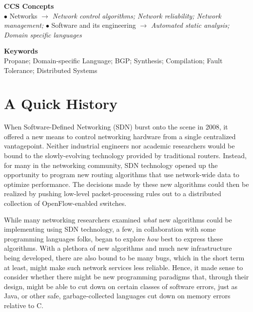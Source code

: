 \documentclass[10pt]{sigalternate052015}
\begin{document}
\vspace{0.1in}
\noindent
\textbf{CCS Concepts}\\
$\bullet$ Networks $\rightarrow$ {\em Network control algorithms; Network reliability; Network management;} 
$\bullet$ Software and its engineering $\rightarrow$ {\em Automated static analysis; Domain specific languages}

\vspace{0.1in}
\noindent
\textbf{Keywords}\\
Propane; Domain-specific Language; BGP; Synthesis; Compilation; Fault Tolerance; Distributed Systems




\section{A Quick History}

When Software-Defined Networking (SDN) burst onto the scene in 2008,
it offered a new means to control networking hardware from a single
centralized vantagepoint.  Neither industrial engineers nor academic
researchers would be bound to the slowly-evolving technology provided by
traditional routers.  Instead, for many in the networking
community, SDN technology opened up the opportunity to program new
routing algorithms that use network-wide data to optimize performance.
The decisions made by these new algorithms could then be realized by
pushing low-level packet-processing rules out to a distributed
collection of OpenFlow-enabled switches.

While many networking researchers examined \emph{what} new algorithms
could be implementing using SDN technology, a few, in collaboration
with some programming languages folks, began to explore \emph{how}
best to express these algorithms.  With a plethora of new algorithms
and much new infrastructure being developed, there are also bound to
be many bugs, which in the short term at least, might make such network
services less reliable.  Hence, it made sense to consider
whether there might be new programming paradigms that, through their
design, might be able to cut down on certain classes of software
errors, just as Java, or other safe, garbage-collected languages cut
down on memory errors relative to C.
\end{document}
